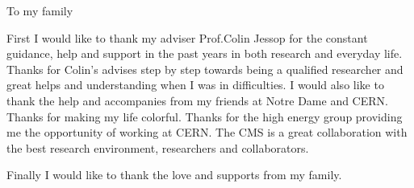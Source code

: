 \documentclass[final,numrefs,sort&compress,noinfo]{nddiss2e}
\begin{document}
\begin{dedication}
To my family 
\end{dedication}

\tableofcontents
\listoffigures
\listoftables




\begin{acknowledge}

First I would like to thank my adviser Prof.Colin Jessop for the constant guidance, help and support in the past years in both research and everyday life. Thanks for Colin's advises step by step towards being a qualified researcher and great helps and understanding when I was in difficulties. I would also like to thank the help and accompanies from my friends at Notre Dame and CERN. Thanks for making my life colorful. Thanks for the high energy group providing me the opportunity of working at CERN. The CMS is a great collaboration with the best research environment, researchers and collaborators. 

Finally I would like to thank the love and supports from my family.  

 


\end{acknowledge}


\mainmatter





%
%



%
%


%
%


%
%


%
%


%
%


%
%


%
%


%
%
\end{document}
